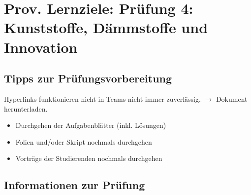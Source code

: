 



\newcommand{\blattname}{Prov. Lernziele: Prüfung 4: Kunststoffe, Dämmstoffe und Innovation}
\newcommand{\nrPruefung}{vierten}
\newcommand{\Added}[1]{\textcolor{blue}{#1}}



\section*{\blattname}
\subsection*{Tipps zur Prüfungsvorbereitung}
Hyperlinks funktionieren nicht in Teams nicht immer zuverlässig. $\rightarrow$ Dokument herunterladen.
\begin{itemize}
	\item Durchgehen der Aufgabenblätter (inkl. Lösungen)

 	\item Folien und/oder Skript nochmals durchgehen
 	\item Vorträge der Studierenden nochmals durchgehen
\end{itemize}

\subsection*{Informationen zur Prüfung}

